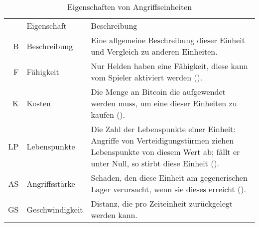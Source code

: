 \begingroup
  \small
  \begin{longtabu}{rlX}
    \rowfont{\normalsize}
    \caption{Eigenschaften von Angriffseinheiten\label{tab:attack-unit-props}}\\

    \midrule[\heavyrulewidth]\rowfont{\itshape}
    & Eigenschaft & Beschreibung \\
    \midrule

    B  & Beschreibung
       & Eine allgemeine Beschreibung dieser Einheit und Vergleich zu anderen
         Einheiten. \\
    F  & Fähigkeit
       & Nur Helden haben eine Fähigkeit, diese kann vom Spieler aktiviert
         werden (). \\
    K  & Kosten
       & Die Menge an Bitcoin die aufgewendet werden muss, um eine dieser
         Einheiten zu kaufen (). \\
    LP & Lebenspunkte
       & Die Zahl der Lebenspunkte einer Einheit: Angriffe von
         Verteidigungstürmen ziehen Lebenspunkte von diesem Wert ab; fällt er
         unter Null, so stirbt diese Einheit (). \\
    AS & Angriffsstärke
       & Schaden, den diese Einheit am gegenerischen Lager verursacht, wenn sie
         dieses erreicht (). \\
    GS & Geschwindigkeit
       & Distanz, die pro Zeiteinheit zurückgelegt werden kann. \\

    \bottomrule
  \end{longtabu}
\endgroup

